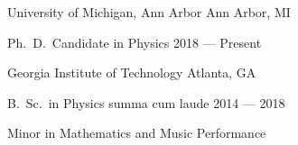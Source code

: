
\orgheader
{University of Michigan, Ann Arbor}
{Ann Arbor, MI}

\degree
{Ph.\ D.\ Candidate in Physics}
{}
{2018 --- Present}

\orgheader
{Georgia Institute of Technology}
{Atlanta, GA}

\degree
{B.\ Sc.\ in Physics}
{summa cum laude}
{2014 --- 2018}

\degree
{Minor in Mathematics and Music Performance}
{}
{}

\vspace{4pt}